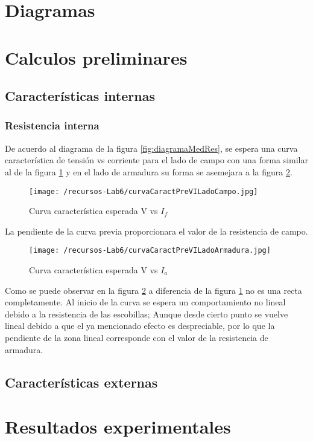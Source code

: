 \documentclass[11pt,letterpaper]{article}     %
\begin{document}
\section{Diagramas}

\section{Calculos preliminares}
\subsection{Características internas}
\subsubsection{Resistencia interna }
De acuerdo al diagrama de la figura \ref{fig:diagramaMedRes},  se espera una curva característica de tensión vs corriente para el lado de campo con una forma similar al de la figura \ref{fig:curvaCaractPreVILadoCampo} y en el lado de armadura su forma se asemejara a la figura \ref{fig:curvaCaractPreVILadoArmadura}.
\begin{figure}[H]
    \centering
    \texttt{[image: /recursos-Lab6/curvaCaractPreVILadoCampo.jpg]}
    \caption{Curva característica esperada V vs $I_{f}$}
    \label{fig:curvaCaractPreVILadoCampo}
\end{figure}
La pendiente de la curva previa proporcionara el valor de la resistencia de campo.
\begin{figure}[H]
    \centering
    \texttt{[image: /recursos-Lab6/curvaCaractPreVILadoArmadura.jpg]}
    \caption{Curva característica esperada V vs $I_{a}$}
    \label{fig:curvaCaractPreVILadoArmadura}
\end{figure} 
Como se puede observar en la figura \ref{fig:curvaCaractPreVILadoArmadura} a diferencia de la figura \ref{fig:curvaCaractPreVILadoCampo} no es una recta completamente. Al inicio de la curva se espera un comportamiento no lineal debido a la resistencia de las escobillas; Aunque desde cierto punto se vuelve lineal debido a que el ya mencionado efecto es despreciable, por lo que la pendiente de la zona lineal corresponde con el valor de la resistencia de armadura. 
\subsection{Características externas}

\section{Resultados experimentales}
\end{document}
